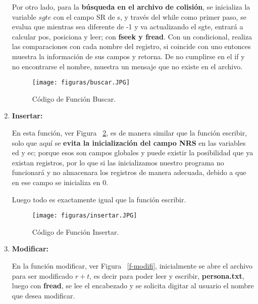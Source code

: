 \documentclass[10pt,conference]{IEEEtran}
\begin{document}
\begin{enumerate}[]
        Por otro lado, para la \textbf{búsqueda en el archivo de colisión}, se inicializa la variable $sgte$ con el campo SR de s, y través del while como primer paso, se evalua que mientras sea diferente de -1 y va actualizando el sgte, entrará a calcular pos, posiciona y leer; con \textbf{fseek y fread}. Con un condicional, realiza las comparaciones con cada nombre del registro, si coincide con uno entonces muestra la información de sus campos y retorna. De no cumplirse en el if y no encontrarse el nombre, muestra un mensaje que no existe en el archivo.
        \begin{figure}[H]
            \begin{center}
            \texttt{[image: figuras/buscar.JPG]}
            \caption{Código de Función Buscar.}
            \label{f-bus} 
            \end{center}
        \end{figure}
    \item {\textbf{Insertar:}}
        \par En esta función, ver Figura ~\ref{f-inser}, es de manera similar que la función escribir, solo que aquí se \textbf{evita la inicialización del campo NRS} en las variables ed y ec; porque esos son campos globales y puede existir la posibilidad que ya existan registros, por lo que si las inicializamos nuestro programa no funcionará y no almacenara los registros de manera adecuada, debido a que en ese campo se inicializa en 0. 
        
        Luego todo es exactamente igual que la función escribir.
         \begin{figure}[H]
            \begin{center}
            \texttt{[image: figuras/insertar.JPG]}
            \caption{Código de Función Insertar.}
            \label{f-inser} 
            \end{center}
        \end{figure}
    
    \item {\textbf{Modificar:}}
        \par En la función modificar, ver Figura ~\ref{f-modifi}, inicialmente se abre el archivo para ser modificado $r + t$, es decir para poder leer y escribir, \textbf{persona.txt}, luego con \textbf{fread}, se lee el encabezado y se solicita digitar al usuario el nombre que desea modificar.
        

\end{enumerate}
\end{document}
